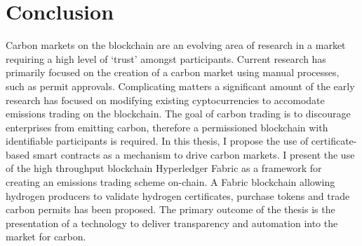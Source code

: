\chapter{Conclusion}\label{ch:conclusion}
Carbon markets on the blockchain are an evolving area of research
in a market requiring a high level of `trust' amongst participants.
Current research has primarily focused on the creation of
a carbon market using manual processes, such as permit approvals.
Complicating matters a significant amount of the early research
has focused on modifying existing cyptocurrencies to accomodate
emissions trading on the blockchain. The goal of carbon trading
is to discourage enterprises from emitting carbon,
therefore a permissioned blockchain
with identifiable participants is required. In this thesis, I propose
the use of certificate-based smart contracts as a mechanism to drive
carbon markets. I present the use of the high throughput blockchain
Hyperledger Fabric as a framework for creating an emissions trading
scheme on-chain. A Fabric blockchain allowing hydrogen producers
to validate hydrogen certificates, purchase tokens and trade carbon
permits has been proposed. The primary outcome of the thesis
is the presentation of a technology to deliver transparency and
automation into the market for carbon.